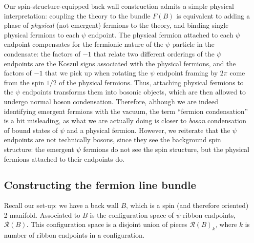 \documentclass[12pt,a4paper]{article}
\newcommand{\mcr}{\mathcal{R}}
\begin{document}
\medskip

Our spin-structure-equipped back wall construction admits a simple physical interpretation: coupling the theory to the bundle $F(B)$ is equivalent to adding a phase of {\it physical} (not emergent) fermions to the theory, and binding single physical fermions to each $\psi$ endpoint.
The physical fermion attached to each $\psi$ endpoint compensates for the fermionic nature of the $\psi$ particle in the condensate: the factors of $-1$ that relate two different orderings of the $\psi$ endpoints are the Koszul signs associated with the physical fermions, and the factors of $-1$ that we pick up when rotating the $\psi$ endpoint framing by $2\pi$ come from the spin $1/2$ of the physical fermions. 
Thus, attaching physical fermions to the $\psi$ endpoints transforms them into bosonic objects, which are then allowed to undergo normal boson condensation. 
Therefore, although we are indeed identifying emergent fermions with the vacuum, the term ``fermion condensation'' is a bit misleading, as what we are actually doing is closer to {\it boson} condensation of bound states of $\psi$ and a physical fermion. 
However, we reiterate that the $\psi$ endpoints are not technically bosons, since they see the background spin structure: the emergent $\psi$ fermions do not see the spin structure, but the physical fermions attached to their endpoints do. 



\subsection{Constructing the fermion line bundle}
\label{fermion_line_bundle}

Recall our set-up: we have a back wall $B$, which is a spin (and therefore oriented) 2-manifold.
Associated to $B$ is the configuration space of $\psi$-ribbon endpoints, $\mcr(B)$.
This configuration space is a disjoint union of pieces $\mcr(B)_k$, where $k$ is number of ribbon endpoints
in a configuration.
\end{document}
